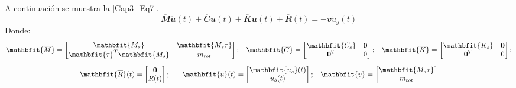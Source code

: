 A continuación se muestra la \ref{Cap3_Eq7}.
\begin{equation}\label{Cap3_Eq7}
\mathbfit{\overline{M}\ddot{u}}(t)+\mathbfit{\overline{C}\dot{u}}(t)+\mathbfit{\overline{K}u}(t)+\mathbfit{\overline{R}}(t)=-\mathbfit{v}\ddot{u}_{g}(t)
\end{equation}
Donde: 
\begin{subequations}\label{Cap3_Eq8}
\begin{gather}
\mathbfit{\overline{M}}=\begin{bmatrix}
\mathbfit{M_{s}} & \mathbfit{M_{s} \tau} \\ 
\mathbfit{\tau}^{T} \mathbfit{M_{s}}  & m_{tot}
\end{bmatrix};\hspace{3mm} 
\mathbfit{\overline{C}}=\begin{bmatrix}
\mathbfit{C_{s}}  & \mathbf{0}\\ 
\mathbf{0}^{T}      & 0
\end{bmatrix}; \hspace{3mm} 
\mathbfit{\overline{K}}=\begin{bmatrix}
\mathbfit{K_{s}}  & \mathbf{0}\\ 
\mathbf{0}^{T}      & 0
\end{bmatrix};		\label{Cap3_Eq8_1} \\[2 mm]
\mathbfit{\overline{R}}(t)=\begin{bmatrix}
\mathbf{0}\\ 
R(t)
\end{bmatrix};\hspace{6mm} 
\mathbfit{u}(t)=\begin{bmatrix}
\mathbfit{u_{s}}(t)\\ 
u_{b}(t)
\end{bmatrix};\hspace{3mm} 
\mathbfit{v}=\begin{bmatrix}
\mathbfit{M_{s} \tau} \\ 
m_{tot}
\end{bmatrix}
		\label{Cap3_Eq8_2}
\end{gather}
\end{subequations}


